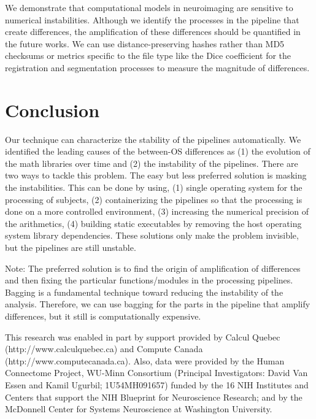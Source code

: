 \documentclass[a4paper,num-refs]{oup-contemporary}
\newcommand{\note}[2]{\color{blue}Note: #1\color{black}}
\begin{document}
We demonstrate that computational models in neuroimaging are sensitive to numerical instabilities. 
Although we identify the processes in the pipeline that create differences, 
the amplification of these differences should be quantified in the future works.
We can use distance-preserving hashes rather than MD5 checksums or metrics specific to the file type like the Dice coefficient 
for the registration and segmentation processes to measure the magnitude of differences. 


\section{Conclusion}

Our technique can characterize the stability of the pipelines
automatically. We identified the leading causes of the between-OS differences as (1) the evolution 
of the math libraries over time and (2) the instability of the pipelines. 
There are two ways to tackle this problem. The easy but less preferred solution is masking the instabilities.
This can be done by using, (1) single operating system for the processing of subjects, 
(2) containerizing the pipelines so that the 
processing is done on a more controlled environment, 
(3) increasing the numerical precision of the arithmetics, 
(4) building static executables by removing the host operating system library dependencies. 
These solutions only make the problem invisible, but the pipelines are still unstable.

\note{The preferred solution is to find the origin of amplification of differences and 
then fixing the particular functions/modules in the processing pipelines. 
Bagging is a fundamental technique toward reducing the instability of the analysis.
Therefore, we can use bagging for the parts in the pipeline that amplify differences, 
but it still is computationally expensive. }




\section{Acknowledgments}

This research was enabled in part by support provided by 
Calcul Quebec (http://www.calculquebec.ca) and 
Compute Canada (http://www.computecanada.ca).
Also, data were provided by the Human Connectome Project, WU-Minn 
Consortium (Principal Investigators: David Van Essen and Kamil Ugurbil; 
1U54MH091657) funded by the 16 NIH Institutes and Centers that support 
the NIH Blueprint for Neuroscience Research; and by the McDonnell 
Center for Systems Neuroscience at Washington University.
\end{document}
